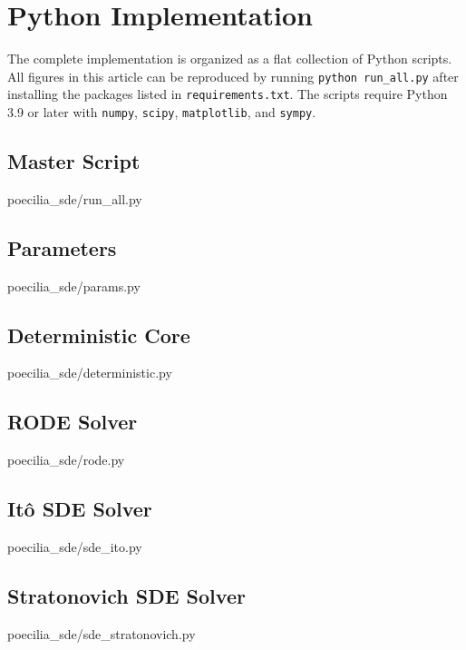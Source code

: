 \documentclass[12pt]{article}
\begin{document}
\section{Python Implementation}\label{app:code}
The complete implementation is organized as a flat collection of Python scripts.
All figures in this article can be reproduced by running \texttt{python run\_all.py}
after installing the packages listed in \texttt{requirements.txt}.
The scripts require Python 3.9 or later with \texttt{numpy}, \texttt{scipy},
\texttt{matplotlib}, and \texttt{sympy}.

{\footnotesize 

\subsection*{Master Script}

  {poecilia_sde/run_all.py}

\subsection*{Parameters}

  {poecilia_sde/params.py}

\subsection*{Deterministic Core}

  {poecilia_sde/deterministic.py}

\subsection*{RODE Solver}

  {poecilia_sde/rode.py}

\subsection*{It\^{o} SDE Solver}

  {poecilia_sde/sde_ito.py}

\subsection*{Stratonovich SDE Solver}

  {poecilia_sde/sde_stratonovich.py}

}
\end{document}
